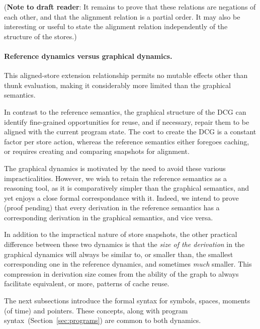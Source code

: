 \documentclass[11pt]{article}
\begin{document}
\begin{mathpar}
\end{mathpar}

\noindent
(\textbf{Note to draft reader}:
It remains to prove that these relations are negations of each other,
and that the alignment relation is a partial order.
%
It may also be interesting or useful to state the alignment relation
independently of the structure of the stores.)

\paragraph{Reference dynamics versus graphical dynamics.}
%
This aligned-store extension relationship permits no
mutable effects other than thunk evaluation, making it considerably
more limited than the graphical semantics.

In contrast to the reference semantics, the graphical structure of the
DCG can identify fine-grained opportunities for reuse, and if
necessary, repair them to be aligned with the current program state.
%
The cost to create the DCG is a constant factor per store action,
whereas the reference semantics either foregoes caching, or requires
creating and comparing snapshots for alignment.

%
The graphical dynamics is motivated by the need to avoid these various
impracticalities.
%
However, we wish to retain the reference semantics as a reasoning tool,
as it is comparatively simpler than the graphical semantics,
and yet enjoys a close formal correspondance with it.
%
Indeed, we intend to prove (proof pending) that every derivation in
the reference semantics has a corresponding derivation in the
graphical semantics, and vice versa.

In addition to the impractical nature of store snapshots, the other practical
difference between these two dynamics is that the \emph{size of the
derivation} in the graphical dynamics will always be similar to, or
smaller than, the smallest corresponding one in the reference
dynamics, and sometimes \emph{much} smaller.
%
This compression in derivation size comes from the ability of the
graph to always facilitate equivalent, or more, patterns of cache reuse.

The next subsections introduce the formal syntax for symbols, spaces, moments (of time) and pointers.
%
These concepts, along with program syntax~(Section~\ref{sec:programs}) are common to both dynamics.
\end{document}
